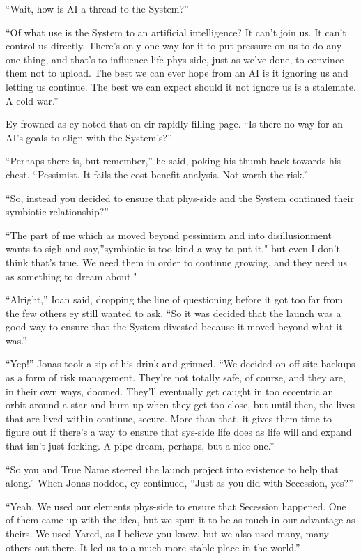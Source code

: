 ``Wait, how is AI a thread to the System?''

``Of what use is the System to an artificial intelligence? It can't join us. It can't control us directly. There's only one way for it to put pressure on us to do any one thing, and that's to influence life phys-side, just as we've done, to convince them not to upload. The best we can ever hope from an AI is it ignoring us and letting us continue. The best we can expect should it not ignore us is a stalemate. A cold war.''

Ey frowned as ey noted that on eir rapidly filling page. ``Is there no way for an AI's goals to align with the System's?''

``Perhaps there is, but remember,'' he said, poking his thumb back towards his chest. ``Pessimist. It fails the cost-benefit analysis. Not worth the risk.''

``So, instead you decided to ensure that phys-side and the System continued their symbiotic relationship?''

``The part of me which as moved beyond pessimism and into disillusionment wants to sigh and say,''symbiotic is too kind a way to put it," but even I don't think that's true. We need them in order to continue growing, and they need us as something to dream about."

``Alright,'' Ioan said, dropping the line of questioning before it got too far from the few others ey still wanted to ask. ``So it was decided that the launch was a good way to ensure that the System divested because it moved beyond what it was.''

``Yep!'' Jonas took a sip of his drink and grinned. ``We decided on off-site backups as a form of risk management. They're not totally safe, of course, and they are, in their own ways, doomed. They'll eventually get caught in too eccentric an orbit around a star and burn up when they get too close, but until then, the lives that are lived within continue, secure. More than that, it gives them time to figure out if there's a way to ensure that sys-side life does as life will and expand that isn't just forking. A pipe dream, perhaps, but a nice one.''

``So you and True Name steered the launch project into existence to help that along.'' When Jonas nodded, ey continued, ``Just as you did with Secession, yes?''

``Yeah. We used our elements phys-side to ensure that Secession happened. One of them came up with the idea, but we spun it to be as much in our advantage as theirs. We used Yared, as I believe you know, but we also used many, many others out there. It led us to a much more stable place in the world.''

